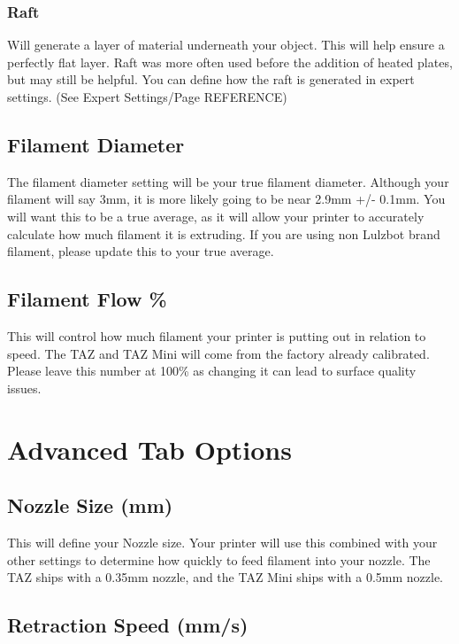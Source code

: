 \subsubsection{Raft}

Will generate a layer of material underneath your object. This will help ensure a perfectly flat layer. Raft was more often used before the addition of heated plates, but may still be helpful. You can define how the raft is generated in expert settings. (See Expert Settings/Page REFERENCE)

\subsection{Filament Diameter}

The filament diameter setting will be your true filament diameter. Although your filament will say 3mm, it is more likely going to be near 2.9mm +/- 0.1mm. You will want this to be a true average, as it will allow your printer to accurately calculate how much filament it is extruding. If you are using non Lulzbot brand filament, please update this to your true average.

\subsection{Filament Flow \%}

This will control how much filament your printer is putting out in relation to speed. The TAZ and TAZ Mini will come from the factory already calibrated. Please leave this number at 100\% as changing it can lead to surface quality issues.

\section{Advanced Tab Options}

\subsection{Nozzle Size (mm)}

This will define your Nozzle size. Your printer will use this combined with your other settings to determine how quickly to feed filament into your nozzle. The TAZ ships with a 0.35mm nozzle, and the TAZ Mini ships with a 0.5mm nozzle.

\subsection{Retraction Speed (mm/s)}

